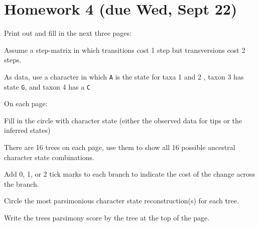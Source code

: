 \documentclass[landscape]{foils}
\begin{document}
\pagecolor{white}


\section*{Homework 4 (due Wed, Sept 22)}
\begin{compactenum}
	\item Print out and fill in the next three pages:
		\begin{compactitem}
			\item Assume a step-matrix in which transitions cost 1 step but transversions cost 2 steps.
			\item As data, use a character in which  {\tt A} is the state for taxa 1 and 2 , taxon 3 has state {\tt G}, and taxon 4 has a {\tt C}
		\end{compactitem}
	\item On each page:
	\begin{compactenum}
		\item Fill in the circle with character state (either the observed data for tips or the inferred states)
		\item There are 16 trees on each page, use them to show all 16 possible ancestral character state combinations.
		\item Add 0, 1, or 2 tick marks to each branch to indicate the cost of the change across the branch.
		\item Circle the most parsimonious character state reconstruction(s) for each tree.
		\item Write the trees parsimony score by the tree at the top of the page.
	\end{compactenum}
\end{compactenum}

\end{document}
